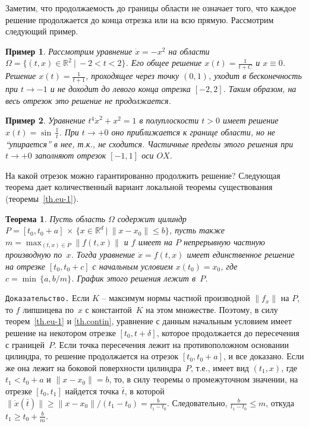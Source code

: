 \documentclass[12pt,a4paper]{article}
\newtheorem{theorem}{Теорема}
\newtheorem{ex}{Пример}
\newcommand{\re}{{\mathbb R}}
\begin{document}
Заметим, что продолжаемость до границы области не означает того, что каждое решение продолжается
до конца отрезка или на всю прямую. Рассмотрим следующий пример.
\begin{ex}\label{ex.lip1}
{\em Рассмотрим уравнение $\dot x = -x^2$ на области $\Omega = \{(t, x )\in \re^2 \ | \ -2< t < 2\}$. Его общее решение $x(t) = \frac{1}{t+C}$ и $x\equiv 0$.
Решение $x(t) = \frac{1}{t+1}$, проходящее через точку $(0,1)$, уходит в бесконечность при
$t \to -1$ и не доходит до левого конца отрезка $[-2,2]$. Таким образом, на весь отрезок это решение не продолжается.}
\end{ex}
\begin{ex}\label{ex.lip2}
{\em Уравнение $t^4\dot x^2 + x^2 = 1$ в полуплоскости $t> 0$
имеет решение $x(t) = \sin\, \frac{1}{t}$.
При $t\to +0$ оно приближается к границе области, но не ``упирается'' в нее, т.к., не сходится. Частичные пределы
этого решения при $t \to +0$ заполняют отрезок $[-1,1]$ оси $OX$. }
\end{ex}

На какой отрезок можно гарантированно продолжить решение?   Следующая теорема дает количественный вариант локальной теоремы существования (теоремы~\ref{th.eu-1}).
\begin{theorem}\label{th.segment}
Пусть область $\Omega$ содержит цилиндр $P = [t_0, t_0+a]\, \times \, \bigl\{x \in \re^d \ | \ \|x-x_0\|\le b\bigr\}$,
пусть также $m = \max_{(t, x) \in P}\|f(t, x)\|$ и $f$ имеет на $P$ непрерывную частную производную по~$x$. Тогда
уравнение $\dot x = f(t, x)$ имеет единственное решение на отрезке $[t_0, t_0 + c]$ с начальным условием
$x(t_0) = x_0$, где $c = \min\, \{a, b/m\}$. График этого решения лежит в~$P$.
\end{theorem}
{\tt Доказательство.} Если $K$ -- максимум нормы частной производной $\|f_x\|$ на $P$, то $f$ липшицева по~$x$
с константой~$K$ на этом множестве. Поэтому, в силу теорем~\ref{th.eu-1} и \ref{th.contin}, уравнение
с данным начальным условием имеет решение
на некотором отрезке $[t_0, t+\delta]$, которое продолжается до пересечения с границей~$P$.
Если точка пересечения лежит на противоположном основании цилиндра, то решение продолжается на отрезок
$[t_0, t_0 + a]$, и все доказано. Если же она лежит на боковой поверхности цилиндра~$P$, т.е., имеет вид $(t_1, x)$,
где $t_1 < t_0 + a$ и $\|x-x_0\| = b$, то, в силу теоремы о промежуточном значении,
на отрезке $[t_0, t_1]$ найдется точка $\bar t$, в которой $\|\dot x(\bar t)\| \ge \|x-x_0\|/(t_1 - t_0) =
\frac{b}{t_1 - t_0}$. Следовательно, $\frac{b}{t_1 - t_0} \le m$, откуда $t_1 \ge t_0 + \frac{b}{m}$.
\end{document}
